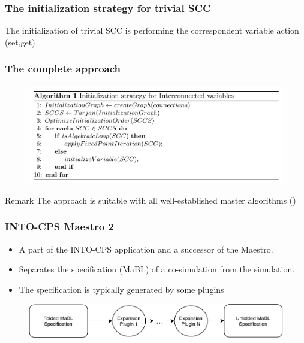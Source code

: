 \documentclass{beamer}
\begin{document}
\begin{frame}
\frametitle{The initialization strategy for trivial SCC}
The initialization of trivial SCC is performing the correspondent variable action (set,get) 
    
\end{frame}

\begin{frame}[fragile]
\frametitle{The complete approach}
\begin{figure}
    \centering
    \includegraphics[scale=0.25]{images/Screenshot 2020-09-09 at 09.12.56.png}
\end{figure}

\begin{block}{Remark} 
    The approach is suitable with all well-established master algorithms ()
\end{block}
\end{frame}


\begin{frame}
\frametitle{INTO-CPS Maestro 2}
\begin{itemize}
    \item A part of the INTO-CPS application and a successor of the Maestro.    
    \item Separates the specification (MaBL) of a co-simulation from the simulation.
    \item The specification is typically generated by some plugins
\end{itemize}
\begin{figure}
    \centering
    \includegraphics[scale=0.6]{images/ExpansionPlugin-Page-1.pdf}
    \label{fig:my_label}
\end{figure}
\end{frame}
\end{document}
